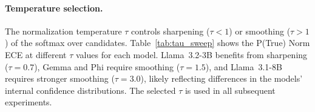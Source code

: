 \begin{table}[htbp]
\centering
\small
{}%
\caption{Effect of P(True) normalization (Llama~3.2-3B, $N{=}2{,}000$).
Raw P(True) improves over the verbalized baseline. Normalization with 
temperature $\tau$ yields further gains.
The optimal $\tau$ varies by model (see Table~\ref{tab:tau_sweep}).}
\label{tab:ptrue_raw_vs_norm}
\end{table}

\paragraph{Temperature selection.}
The normalization temperature $\tau$ controls sharpening ($\tau{<}1$) 
or smoothing ($\tau{>}1$) of the softmax over candidates.
Table~\ref{tab:tau_sweep} shows the P(True) Norm ECE at different 
$\tau$ values for each model.
Llama~3.2-3B benefits from sharpening ($\tau{=}0.7$), Gemma and Phi 
require smoothing ($\tau{=}1.5$), and Llama~3.1-8B requires stronger
smoothing ($\tau{=}3.0$), likely reflecting differences in 
the models' internal confidence distributions.
The selected $\tau$ is used in all subsequent experiments.

\begin{table}[htbp]
\centering
\small
{}%
\caption{P(True) Norm ECE as a function of normalization 
temperature $\tau$. Bold: selected value per model.}
\label{tab:tau_sweep}
\end{table}

